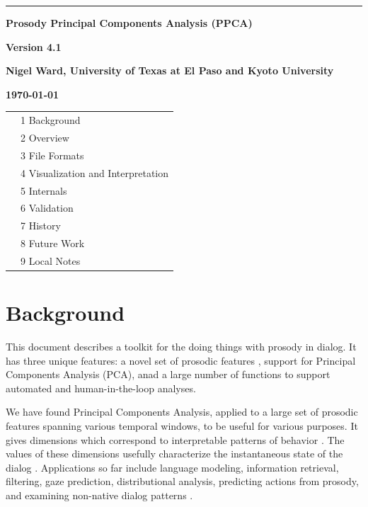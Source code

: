 \documentclass[11pt]{article}
\begin{document}
\noindent
\thispagestyle{empty}
\sloppy

\rule{1mm}{0mm}

\vspace{-17mm}
{\LARGE \bf Prosody Principal Components Analysis (PPCA) }
\medskip


{\LARGE \bf Version 4.1}
\vspace{7mm}


{\bf Nigel Ward, University of Texas at El Paso and Kyoto University}

{\bf \today }



\begin{tabular}{p{7cm}l}
& 1 Background  \\
& 2 Overview \\
& 3 File Formats \\
& 4 Visualization and Interpretation \\
& 5 Internals\\ 
& 6 Validation \\
& 7 History \\
& 8 Future Work \\
& 9 Local Notes
\end{tabular}


\section{Background} 

This document describes a toolkit for the doing things with prosody in
dialog.  It has three unique features: a novel set of prosodic
features \cite{mid-level-features}, support for Principal Components
Analysis (PCA), anad a large number of functions to support automated
and human-in-the-loop analyses.

We have found Principal Components Analysis, applied to a large set of
prosodic features spanning various temporal windows, to be useful for
various purposes.  It gives dimensions which correspond to
interpretable patterns of behavior \cite{prosodic-elements}.  The
values of these dimensions usefully characterize the instantaneous
state of the dialog \cite{dialog-dimensions}.  Applications so far
include language modeling, information retrieval, filtering, gaze
prediction, distributional analysis, predicting actions from prosody,
and examining non-native dialog patterns
\cite{pca-lm,prosody-ir,sigdial-codec,ward-vcip,dimensions-uh-huh}.
\end{document}
